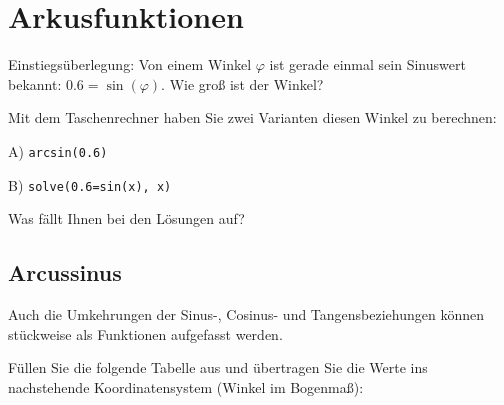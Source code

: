 
\section{Arkusfunktionen}

Einstiegsüberlegung: Von einem Winkel $\varphi$ ist gerade einmal sein Sinuswert bekannt: $0.6 = \sin(\varphi)$. Wie groß ist der Winkel?

\trigsysDsin{}



Mit dem Taschenrechner haben Sie zwei Varianten diesen Winkel zu berechnen:

A) \texttt{arcsin(0.6)}

B) \texttt{solve(0.6=sin(x), x)}

Was fällt Ihnen bei den Lösungen auf?
\newpage



\subsection{Arcussinus}
Auch die Umkehrungen der Sinus-, Cosinus- und Tangensbeziehungen
können stückweise als Funktionen aufgefasst werden.

Füllen Sie die folgende Tabelle aus und übertragen Sie die Werte ins nachstehende
Koordinatensystem (Winkel im Bogenmaß):


